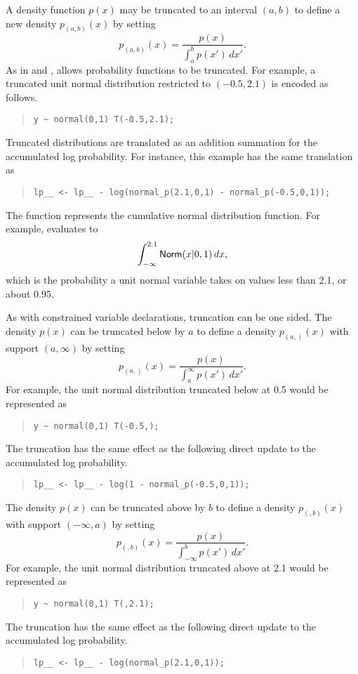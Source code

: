 A density function $p(x)$ may be truncated to an interval $(a,b)$ to
define a new density $p_{(a,b)}(x)$ by setting
%
\[ 
p_{\!(a,b)\!}(x) = \frac{p(x)}
                  {\int_a^b p(x') \, dx'}.
\] 
As in \BUGS and \JAGS, \Stan allows probability functions to be
truncated.  For example, a truncated unit normal distribution
restricted to $(-0.5,2.1)$ is encoded as follows.
%
\begin{quote}
\begin{Verbatim} 
y ~ normal(0,1) T(-0.5,2.1);
\end{Verbatim}
\end{quote}
% 
Truncated distributions are translated as an addition summation for
the accumulated log probability.  For instance, this example has the
same translation as
%
\begin{quote}
\begin{Verbatim}
lp__ <- lp__ - log(normal_p(2.1,0,1) - normal_p(-0.5,0,1));
\end{Verbatim}
\end{quote}
%
The function  represents the cumulative normal
distribution function.  For example,  evaluates to 
\[
\int_{-\infty}^{2.1} \mbox{\sf Norm}(x|0,1) \, dx,
\]
%
which is the probability a unit normal variable takes on values less
than 2.1, or about 0.95.

As with constrained variable declarations, truncation can be one
sided.  The density $p(x)$ can be truncated below by $a$ to define a
density $p_{(a,)}(x)$ with support $(a,\infty)$ by setting
%
\[
p_{(a,)}(x) = \frac{p(x)}
                 {\int_a^{\infty} p(x') \, dx'}.
\]
For example, the unit normal distribution truncated below at 0.5 would
be represented as
%
\begin{quote}
\begin{Verbatim} 
y ~ normal(0,1) T(-0.5,);
\end{Verbatim}
\end{quote}
% 
The truncation has the same effect as the following direct update to
the accumulated log probability.
%
\begin{quote}
\begin{Verbatim}
lp__ <- lp__ - log(1 - normal_p(-0.5,0,1));
\end{Verbatim}
\end{quote}

The density $p(x)$ can be truncated above by $b$ to define a density
$p_{(,b)}(x)$ with support $(-\infty,a)$ by setting
\[
p_{(,b)}(x) = \frac{p(x)}
                    {\int_{-\infty}^b p(x') \, dx'}.
\]
For example, the unit normal distribution truncated above at 2.1 would
be represented as
%
\begin{quote}
\begin{Verbatim} 
y ~ normal(0,1) T(,2.1);
\end{Verbatim}
\end{quote}
% 
The truncation has the same effect as the following direct update to
the accumulated log probability.
%
\begin{quote}
\begin{Verbatim}
lp__ <- lp__ - log(normal_p(2.1,0,1));
\end{Verbatim}
\end{quote}


